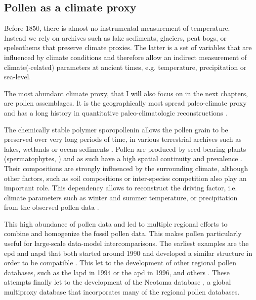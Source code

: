 \begin{refsection}
\subsection{Pollen as a climate proxy}  \label{sec:intro-paleo-data}
Before 1850, there is almost no instrumental measurement of temperature. Instead we rely on archives such as lake sediments, glaciers, peat bogs, or speleothems that preserve climate proxies. The latter is a set of variables that are influenced by climate conditions and therefore allow an indirect measurement of climate(-related) parameters at ancient times, e.g. temperature, precipitation or sea-level. 

The most abundant climate proxy, that I will also focus on in the next chapters, are pollen assemblages. It is the  geographically most spread paleo-climate proxy \citep{BirksBirks1980} and has a long history in quantitative paleo-climatologic reconstructions \citep[e.g.][]{Nichols1967, Nichols1969, Bradley1985, Iversen1944}.

The chemically stable polymer sporopollenin allows the pollen grain to be preserved over very long periods of time, in various terrestrial archives such as lakes, wetlands or ocean sediments \citep{FaegriKalandKrzywinski1989, Havinga1967}. Pollen are produced by seed-bearing plants (spermatophytes, \cite{Wodehouse1935}) and as such have a high spatial continuity and prevalence \citep{ChevalierDavisGajewskiEtAlinprep}. Their compositions are strongly influenced by the surrounding climate, although other factors, such as soil compositions or inter-species competition also play an important role. This dependency allows to reconstruct the driving factor, i.e. climate parameters such as winter and summer temperature, or precipitation from the observed pollen data \citep{JugginsBirks2012,Juggins2013,BrewerGuiotBarboni2007, ChevalierDavisGajewskiEtAlinprep}.

This high abundance of pollen data and led to multiple regional efforts to combine and homogenize the fossil pollen data. This makes pollen particularly useful for large-scale data-model intercomparisons. The earliest examples are the \gls{epd} and \gls{napd}  that both started around 1990 and developed a similar structure in order to be compatible \citep{Grimm2008, FyfeBeaulieuBinneyEtAl2009} . This let to the development of other regional pollen databases, such as the \gls{lapd} \citep{FlantuaHooghiemstraGrimmEtAl2015, MarchantAlmeidaBehlingEtAl2002} in 1994 or the \gls{apd} \citep{VincensLezineBuchetEtAl2007} in 1996, and others \citep[see][]{Grimm2008}. These attempts finally let to the development of the Neotoma database \citep{WilliamsGrimmBloisEtAl2018}, a global multiproxy database that incorporates many of the regional pollen databases.


\end{refsection}

